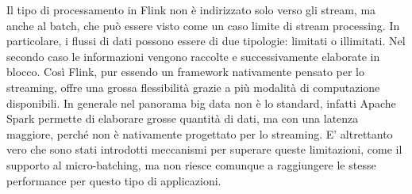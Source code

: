 Il tipo di processamento in Flink non è indirizzato solo verso gli stream, ma anche al batch, che può essere visto come un caso limite di stream processing. In particolare, i flussi di dati possono essere di due tipologie: limitati o illimitati. Nel secondo caso le informazioni vengono raccolte e successivamente elaborate in blocco. Così Flink, pur essendo un framework nativamente pensato per lo streaming, offre una grossa flessibilità grazie a più modalità di computazione disponibili. In generale nel panorama big data non è lo standard, infatti Apache Spark permette di elaborare grosse quantità di dati, ma con una latenza maggiore, perché non è nativamente progettato per lo streaming. E' altrettanto vero che sono stati introdotti meccanismi per superare queste limitazioni, come il supporto al micro-batching, ma non riesce comunque a raggiungere le stesse performance per questo tipo di applicazioni.




